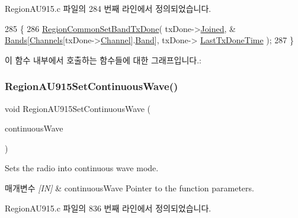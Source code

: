 Region\+A\+U915.\+c 파일의 284 번째 라인에서 정의되었습니다.


\begin{DoxyCode}
285 \{
286     \mbox{\hyperlink{group___r_e_g_i_o_n_c_o_m_m_o_n_ga491dea5590228a0cd33affd71743779c}{RegionCommonSetBandTxDone}}( txDone->\mbox{\hyperlink{structs_set_band_tx_done_params_ac2f6caa0f3b02d2ac5056c3ee7c22652}{Joined}}, &
      \mbox{\hyperlink{_region_a_u915_8c_ae1fd88ab10531e31349da4c7fbff834c}{Bands}}[\mbox{\hyperlink{_region_a_u915_8c_aef41de8bb5a74331478b9f755e713542}{Channels}}[txDone->\mbox{\hyperlink{structs_set_band_tx_done_params_a1ca6f01ca18afe402de51babe8c95f5e}{Channel}}].\mbox{\hyperlink{structs_channel_params_a724c03aa06953111c3291243831f251b}{Band}}], txDone->
      \mbox{\hyperlink{structs_set_band_tx_done_params_a7316dfb002c4e0015fceeb727020fe5c}{LastTxDoneTime}} );
287 \}
\end{DoxyCode}
이 함수 내부에서 호출하는 함수들에 대한 그래프입니다.\+:
\mbox{\label{group___r_e_g_i_o_n_a_u915_gae8d539bbf21ee45777245dc1467fa07a}} 
\subsubsection{\texorpdfstring{Region\+A\+U915\+Set\+Continuous\+Wave()}{RegionAU915SetContinuousWave()}}
{\footnotesize\ttfamily void Region\+A\+U915\+Set\+Continuous\+Wave (\begin{DoxyParamCaption}\item[{\mbox{\hyperlink{group___r_e_g_i_o_n_gaf39bb5ba06921139c6d17f88a8d518cd}{Continuous\+Wave\+Params\+\_\+t}} $\ast$}]{continuous\+Wave }\end{DoxyParamCaption})}



Sets the radio into continuous wave mode. 


\begin{DoxyParams}{매개변수}
{\em \mbox{[}\+I\+N\mbox{]}} & continuous\+Wave Pointer to the function parameters. \\
\hline
\end{DoxyParams}


Region\+A\+U915.\+c 파일의 836 번째 라인에서 정의되었습니다.


